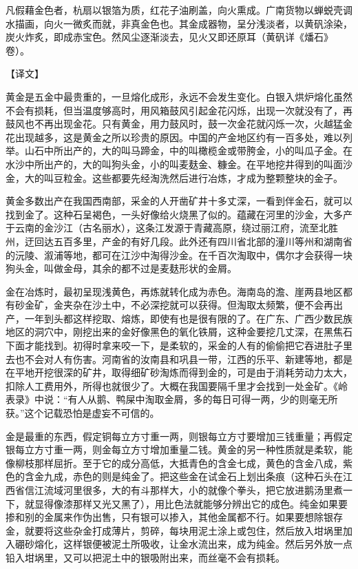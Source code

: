 \documentclass[12pt,UTF8]{ctexbook}
\begin{document}
凡假藉金色者，杭扇以银箔为质，红花子油刷盖，向火熏成。广南货物以蝉蜕壳调水描画，向火一微炙而就，非真金色也。其金成器物，呈分浅淡者，以黄矾涂染，炭火炸炙，即成赤宝色。然风尘逐渐淡去，见火又即还原耳（黄矾详《燔石》卷）。

【译文】

黄金是五金中最贵重的，一旦熔化成形，永远不会发生变化。白银入烘炉熔化虽然不会有损耗，但当温度够高时，用风箱鼓风引起金花闪烁，出现一次就没有了，再鼓风也不再出现金花。只有黄金，用力鼓风时，鼓一次金花就闪烁一次，火越猛金花出现越多，这是黄金之所以珍贵的原因。中国的产金地区约有一百多处，难以列举。山石中所出产的，大的叫马蹄金，中的叫橄榄金或带胯金，小的叫瓜子金。在水沙中所出产的，大的叫狗头金，小的叫麦麸金、糠金。在平地挖井得到的叫面沙金，大的叫豆粒金。这些都要先经淘洗然后进行冶炼，才成为整颗整块的金子。

黄金多数出产在我国西南部，采金的人开凿矿井十多丈深，一看到伴金石，就可以找到金了。这种石呈褐色，一头好像给火烧黑了似的。蕴藏在河里的沙金，大多产于云南的金沙江（古名丽水），这条江发源于青藏高原，绕过丽江府，流至北胜州，迂回达五百多里，产金的有好几段。此外还有四川省北部的潼川等州和湖南省的沅陵、溆浦等地，都可在江沙中淘得沙金。在千百次淘取中，偶尔才会获得一块狗头金，叫做金母，其余的都不过是麦麸形状的金屑。

金在冶炼时，最初呈现浅黄色，再炼就转化成为赤色。海南岛的澹、崖两县地区都有砂金矿，金夹杂在沙土中，不必深挖就可以获得。但淘取太频繁，便不会再出产，一年到头都这样挖取、熔炼，即使有也是很有限的了。在广东、广西少数民族地区的洞穴中，刚挖出来的金好像黑色的氧化铁屑，这种金要挖几丈深，在黑焦石下面才能找到。初得时拿来咬一下，是柔软的，采金的人有的偷偷把它吞进肚子里去也不会对人有伤害。河南省的汝南县和巩县一带，江西的乐平、新建等地，都是在平地开挖很深的矿井，取得细矿砂淘炼而得到金的，可是由于消耗劳动力太大，扣除人工费用外，所得也就很少了。大概在我国要隔千里才会找到一处金矿。《岭表录》中说：“有人从鹅、鸭屎中淘取金屑，多的每日可得一两，少的则毫无所获。”这个记载恐怕是虚妄不可信的。

金是最重的东西，假定铜每立方寸重一两，则银每立方寸要增加三钱重量；再假定银每立方寸重一两，则金每立方寸增加重量二钱。黄金的另一种性质就是柔软，能像柳枝那样屈折。至于它的成分高低，大抵青色的含金七成，黄色的含金八成，紫色的含金九成，赤色的则是纯金了。把这些金在试金石上划出条痕（这种石头在江西省信江流域河里很多，大的有斗那样大，小的就像个拳头，把它放进鹅汤里煮一下，就显得像漆那样又光又黑了），用比色法就能够分辨出它的成色。纯金如果要掺和别的金属来作伪出售，只有银可以掺入，其他金属都不行。如果要想除银存金，就要将这些杂金打成薄片，剪碎，每块用泥土涂上或包住，然后放入坩埚里加入硼砂熔化，这样银便被泥土所吸收，让金水流出来，成为纯金。然后另外放一点铅入坩埚里，又可以把泥土中的银吸附出来，而丝毫不会有损耗。
\end{document}
